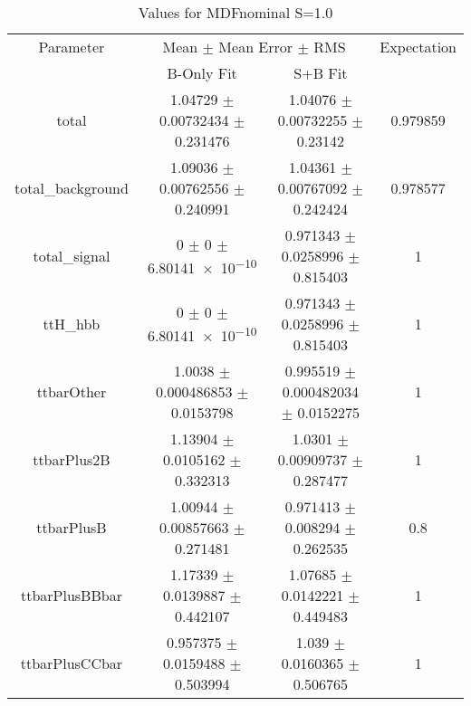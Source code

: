 \begin{table}
\centering
\caption{Values for MDFnominal S=1.0}
\begin{tabular}{cccc}
\toprule
Parameter & \multicolumn{2}{c}{Mean $\pm$ Mean Error $\pm$ RMS} & Expectation\\
 & B-Only Fit & S+B Fit & \\
\midrule
total & \num{1.04729} $\pm$ \num{0.00732434} $\pm$ \num{0.231476} & \num{1.04076} $\pm$ \num{0.00732255} $\pm$ \num{0.23142} & \num{0.979859}\\
total\_background & \num{1.09036} $\pm$ \num{0.00762556} $\pm$ \num{0.240991} & \num{1.04361} $\pm$ \num{0.00767092} $\pm$ \num{0.242424} & \num{0.978577}\\
total\_signal & \num{0} $\pm$ \num{0} $\pm$ \num{6.80141e-10} & \num{0.971343} $\pm$ \num{0.0258996} $\pm$ \num{0.815403} & \num{1}\\
ttH\_hbb & \num{0} $\pm$ \num{0} $\pm$ \num{6.80141e-10} & \num{0.971343} $\pm$ \num{0.0258996} $\pm$ \num{0.815403} & \num{1}\\
ttbarOther & \num{1.0038} $\pm$ \num{0.000486853} $\pm$ \num{0.0153798} & \num{0.995519} $\pm$ \num{0.000482034} $\pm$ \num{0.0152275} & \num{1}\\
ttbarPlus2B & \num{1.13904} $\pm$ \num{0.0105162} $\pm$ \num{0.332313} & \num{1.0301} $\pm$ \num{0.00909737} $\pm$ \num{0.287477} & \num{1}\\
ttbarPlusB & \num{1.00944} $\pm$ \num{0.00857663} $\pm$ \num{0.271481} & \num{0.971413} $\pm$ \num{0.008294} $\pm$ \num{0.262535} & \num{0.8}\\
ttbarPlusBBbar & \num{1.17339} $\pm$ \num{0.0139887} $\pm$ \num{0.442107} & \num{1.07685} $\pm$ \num{0.0142221} $\pm$ \num{0.449483} & \num{1}\\
ttbarPlusCCbar & \num{0.957375} $\pm$ \num{0.0159488} $\pm$ \num{0.503994} & \num{1.039} $\pm$ \num{0.0160365} $\pm$ \num{0.506765} & \num{1}\\
\bottomrule
\end{tabular}
\end{table}